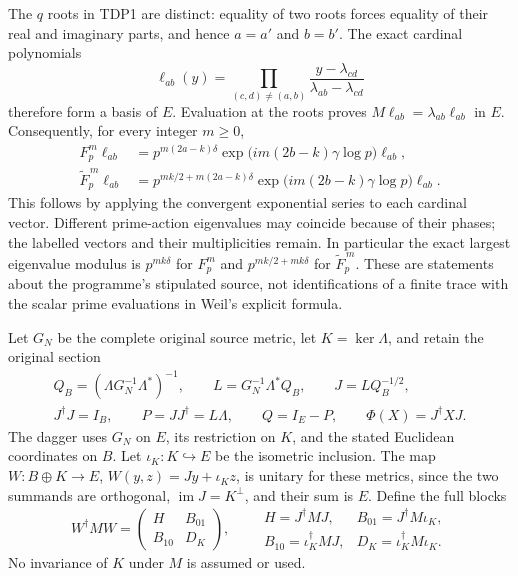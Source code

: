 The $q$ roots in TDP1 are distinct: equality of two roots forces equality
of their real and imaginary parts, and hence $a=a'$ and $b=b'$.
The exact cardinal polynomials
\begin{equation}\tag{TDP2}
\ell_{ab}(y)=\prod_{(c,d)\ne(a,b)}
 \frac{y-\lambda_{cd}}{\lambda_{ab}-\lambda_{cd}}
\end{equation}
therefore form a basis of $E$. Evaluation at the roots proves
$M\ell_{ab}=\lambda_{ab}\ell_{ab}$ in $E$. Consequently, for every
integer $m\ge0$,
\begin{equation}\tag{TDP3}
\begin{aligned}
F_p^m\ell_{ab}
 &=p^{m(2a-k)\delta}
   \exp\!\bigl(im(2b-k)\gamma\log p\bigr)\ell_{ab},\\
\widetilde F_p^{\,m}\ell_{ab}
 &=p^{mk/2+m(2a-k)\delta}
   \exp\!\bigl(im(2b-k)\gamma\log p\bigr)\ell_{ab}.
\end{aligned}
\end{equation}
This follows by applying the convergent exponential series to each
cardinal vector. Different prime-action eigenvalues may coincide because
of their phases; the labelled vectors and their multiplicities remain.
In particular the exact largest eigenvalue modulus is $p^{mk\delta}$
for $F_p^m$ and $p^{mk/2+mk\delta}$ for $\widetilde F_p^{\,m}$.
These are statements about the programme's stipulated source, not
identifications of a finite trace with the scalar prime evaluations in
Weil's explicit formula.

Let $G_N$ be the complete original source metric, let
$K=\ker\Lambda$, and retain the original section
\begin{equation}\tag{TDP4}
\begin{gathered}
Q_B=(\Lambda G_N^{-1}\Lambda^*)^{-1},\qquad
L=G_N^{-1}\Lambda^*Q_B,\qquad J=LQ_B^{-1/2},\\
J^\dagger J=I_B,\qquad P=JJ^\dagger=L\Lambda,\qquad
Q=I_E-P,\qquad \Phi(X)=J^\dagger XJ.
\end{gathered}
\end{equation}
The dagger uses $G_N$ on $E$, its restriction on $K$, and the stated
Euclidean coordinates on $B$. Let $\iota_K:K\hookrightarrow E$ be the
isometric inclusion. The map $W:B\oplus K\to E$,
$W(y,z)=Jy+\iota_Kz$, is unitary for these metrics, since the two
summands are orthogonal, $\operatorname{im}J=K^\perp$, and their sum is
$E$. Define the full blocks
\begin{equation}\tag{TDP5}
W^\dagger MW=
\begin{pmatrix}H&B_{01}\\ B_{10}&D_K\end{pmatrix},\qquad
\begin{array}{ll}
H=J^\dagger MJ,&B_{01}=J^\dagger M\iota_K,\\
B_{10}=\iota_K^\dagger MJ,&D_K=\iota_K^\dagger M\iota_K.
\end{array}
\end{equation}
No invariance of $K$ under $M$ is assumed or used.

